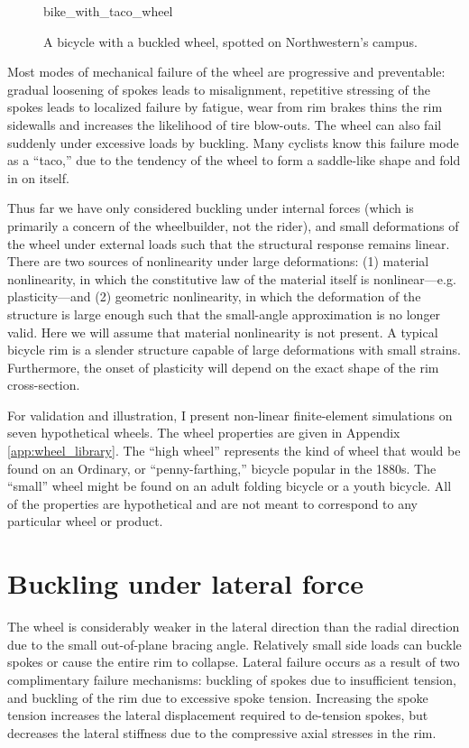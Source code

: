 \documentclass[\rootdir/thesis.tex]{subfiles}
\begin{document}
\begin{figure}[b]
\centering
{bike_with_taco_wheel}
\caption[A bicycle with a buckled wheel]{A bicycle with a buckled wheel, spotted on Northwestern's campus.}
\label{fig:bike_taco_wheel}
\end{figure}

Most modes of mechanical failure of the wheel are progressive and preventable: gradual loosening of spokes leads to misalignment, repetitive stressing of the spokes leads to localized failure by fatigue, wear from rim brakes thins the rim sidewalls and increases the likelihood of tire blow-outs. The wheel can also fail suddenly under excessive loads by buckling. Many cyclists know this failure mode as a ``taco,'' due to the tendency of the wheel to form a saddle-like shape and fold in on itself.

Thus far we have only considered buckling under internal forces (which is primarily a concern of the wheelbuilder, not the rider), and small deformations of the wheel under external loads such that the structural response remains linear. There are two sources of nonlinearity under large deformations: (1) material nonlinearity, in which the constitutive law of the material itself is nonlinear---e.g. plasticity---and (2) geometric nonlinearity, in which the deformation of the structure is large enough such that the small-angle approximation is no longer valid. Here we will assume that material nonlinearity is not present. A typical bicycle rim is a slender structure capable of large deformations with small strains. Furthermore, the onset of plasticity will depend on the exact shape of the rim cross-section.

For validation and illustration, I present non-linear finite-element simulations on seven hypothetical wheels. The wheel properties are given in Appendix \ref{app:wheel_library}. The ``high wheel'' represents the kind of wheel that would be found on an Ordinary, or ``penny-farthing,'' bicycle popular in the 1880s. The ``small'' wheel might be found on an adult folding bicycle or a youth bicycle. All of the properties are hypothetical and are not meant to correspond to any particular wheel or product.


\section{Buckling under lateral force}
\label{sec:buckling_lat_force}

The wheel is considerably weaker in the lateral direction than the radial direction due to the small out-of-plane bracing angle. Relatively small side loads can buckle spokes or cause the entire rim to collapse. Lateral failure occurs as a result of two complimentary failure mechanisms: buckling of spokes due to insufficient tension, and buckling of the rim due to excessive spoke tension. Increasing the spoke tension increases the lateral displacement required to de-tension spokes, but decreases the lateral stiffness due to the compressive axial stresses in the rim.
\end{document}
